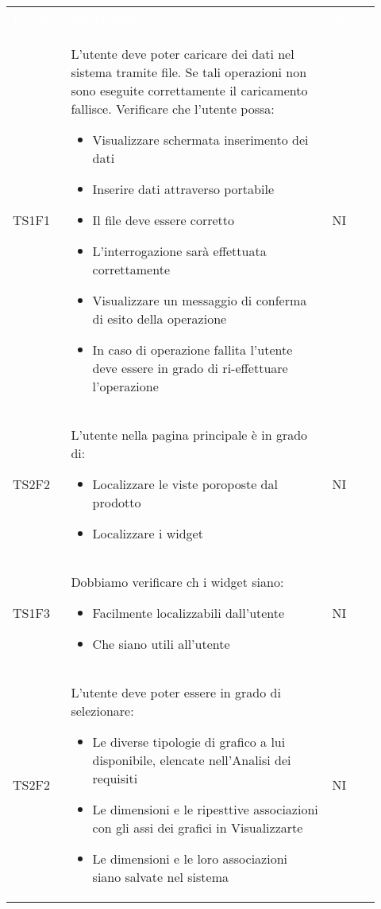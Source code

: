 \renewcommand{\arraystretch}{1.5}
\begin{longtable}{p{0.12\linewidth}p{0.68\linewidth}p{0.12\linewidth}}
	\rowcolor[RGB]{33, 73, 50}
	\textcolor{white}{\textbf{Codice}} & \textcolor{white}{\textbf{Descrizione}} & \textcolor{white}{\textbf{Stato}}\\
    \rowcolor[RGB]{233, 245, 206}
    TS1F1 &
    L'utente deve poter caricare dei dati nel sistema tramite file. 
    Se tali operazioni non sono eseguite
    correttamente il caricamento fallisce. Verificare che l'utente possa:
    \begin{itemize}
        \item Visualizzare schermata inserimento dei dati
        \item Inserire dati attraverso portabile
        \item Il file deve essere corretto
        \item L'interrogazione sarà effettuata correttamente
        \item Visualizzare un messaggio di conferma di esito della operazione
        \item In caso di operazione fallita l'utente deve essere in grado di ri-effettuare l'operazione
    \end{itemize}
    & NI\\ 
    \rowcolor[RGB]{216, 235, 171}
    TS2F2 &
    L'utente nella pagina principale è in grado di:
    \begin{itemize}
        \item Localizzare le viste poroposte dal prodotto
        \item Localizzare i widget 
    \end{itemize}
    & NI\\
    \rowcolor[RGB]{233, 245, 206}
    TS1F3 &
    Dobbiamo verificare ch i widget siano:
    \begin{itemize}
        \item Facilmente localizzabili dall'utente
        \item Che siano utili all'utente
    \end{itemize}
    & NI\\
    \rowcolor[RGB]{216, 235, 171}
    TS2F2 &
    L'utente deve poter essere in grado di selezionare:
    \begin{itemize}
        \item Le diverse tipologie di grafico a lui disponibile, elencate nell'Analisi dei requisiti
        \item Le dimensioni e le ripesttive associazioni con gli assi dei grafici in Visualizzarte
        \item Le dimensioni e le loro associazioni siano salvate nel sistema
    \end{itemize}
    & NI\\
\end{longtable}	
